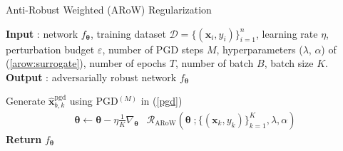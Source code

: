 \documentclass[nohyperref]{article}
\theoremstyle{plain}
\theoremstyle{definition}
\theoremstyle{remark}
\begin{document}
\begin{algorithm}[H]
    \small
    \caption{\footnotesize{Anti-Robust Weighted (ARoW) Regularization}}
    \label{alg:arow}
    \textbf{Input} : network $f_{\bm{\theta}}$, training dataset $\mathcal{D}=\{(\bm{x}_i, y_i) \}_{i=1}^n$, learning rate $\eta$,
    perturbation budget $\varepsilon$, number of PGD steps $M$,
    hyperparameters ($\lambda$, $\alpha$) of (\ref{arow:surrogate}), number of epochs $T$, number of batch $B$, batch size $K$. \\
    \textbf{Output} : adversarially robust network $f_{\bm{\theta}}$
	\begin{algorithmic}[1]
                    \STATE Generate $\widehat{\bm{x}}^{\text{pgd}}_{b, k}$ using PGD$^{(M)}$ in (\ref{pgd}) \\
                    
                \ENDFOR
                \STATE 
                \begin{align*}
                \bm{\theta} \leftarrow 
                \bm{\theta}-\eta\frac{1}{K} \nabla_{\bm{\theta}} & \mathcal{R}_{\text{ARoW}}({\bm{\theta}} \; ; \{(\bm{x}_k, y_k)\}^K_{k=1}, \lambda, \alpha) %
                \end{align*}
            \ENDFOR
        \ENDFOR
        \STATE \textbf{Return} $f_{\bm{\theta}}$
	\end{algorithmic}
\end{algorithm}
\end{document}

